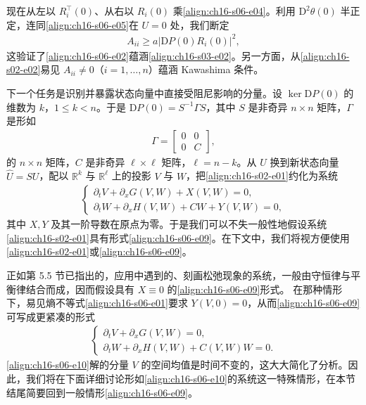 \documentclass[../../main.tex]{subfiles}
\begin{document}
现在从左以 $R_i^\top(0)$、从右以 $R_i(0)$ 乘\eqref{align:ch16-s06-e04}。利用 $\mathrm{D}^2\theta(0)$ 半正定，连同\eqref{align:ch16-s06-e05}在 $U=0$ 处，我们断定
\begin{align}
[R_i^\top(0)\mathrm{D}^2\eta(0)R_i(0)]A_{ii}\geqslant a|\mathrm{D}P(0)R_i(0)|^2,
\label{align:ch16-s06-e07}
\end{align}
这验证了\eqref{align:ch16-s06-e02}蕴涵\eqref{align:ch16-s03-e02}。另一方面，从\eqref{align:ch16-s02-e02}易见 $A_{ii}\neq0$（$i=1,\ldots,n$）蕴涵 Kawashima 条件。

下一个任务是识别并暴露状态向量中直接受阻尼影响的分量。设 $\ker\mathrm{D}P(0)$ 的维数为 $k$，$1\leqslant k<n$。于是 $\mathrm{D}P(0)=S^{-1}\Gamma S$，其中 $S$ 是非奇异 $n\times n$ 矩阵，$\Gamma$ 是形如
\begin{align}
\Gamma=\begin{bmatrix}0&0\\0&C\end{bmatrix},
\label{align:ch16-s06-e08}
\end{align}
的 $n\times n$ 矩阵，$C$ 是非奇异 $\ell\times\ell$ 矩阵，$\ell=n-k$。从 $U$ 换到新状态向量 $\hat U=SU$，配以 $\mathbb{R}^k$ 与 $\mathbb{R}^\ell$ 上的投影 $V$ 与 $W$，把\eqref{align:ch16-s02-e01}约化为系统
\begin{align}
\begin{cases}
\partial_tV+\partial_xG(V,W)+X(V,W)=0,\\
\partial_tW+\partial_xH(V,W)+CW+Y(V,W)=0,
\end{cases}
\label{align:ch16-s06-e09}
\end{align}
其中 $X,Y$ 及其一阶导数在原点为零。于是我们可以不失一般性地假设系统\eqref{align:ch16-s02-e01}具有形式\eqref{align:ch16-s06-e09}。在下文中，我们将视方便使用\eqref{align:ch16-s02-e01}或\eqref{align:ch16-s06-e09}。

正如第 5.5 节已指出的，应用中遇到的、刻画松弛现象的系统，一般由守恒律与平衡律结合而成，因而假设具有 $X\equiv0$ 的\eqref{align:ch16-s06-e09}形式。
在那种情形下，易见熵不等式\eqref{align:ch16-s06-e01}要求 $Y(V,0)=0$，从而\eqref{align:ch16-s06-e09}可写成更紧凑的形式
\begin{align}
\begin{cases}
\partial_tV+\partial_xG(V,W)=0,\\
\partial_tW+\partial_xH(V,W)+C(V,W)W=0.
\end{cases}
\label{align:ch16-s06-e10}
\end{align}
\eqref{align:ch16-s06-e10}解的分量 $V$ 的空间均值是时间不变的，这大大简化了分析。因此，我们将在下面详细讨论形如\eqref{align:ch16-s06-e10}的系统这一特殊情形，在本节结尾简要回到一般情形\eqref{align:ch16-s06-e09}。
\end{document}
